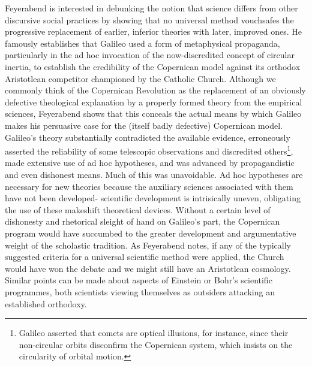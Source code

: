 Feyerabend is interested in debunking the notion that science differs from other discursive social practices by showing that no universal method vouchsafes the progressive replacement of earlier, inferior theories with later, improved ones. He famously establishes that Galileo used a form of metaphysical propaganda, particularly in the ad hoc invocation of the now-discredited concept of circular inertia, to establish the credibility of the Copernican model against its orthodox Aristotlean competitor championed by the Catholic Church. Although we commonly think of the Copernican Revolution as the replacement of an obviously defective theological explanation by a properly formed theory from the empirical sciences, Feyerabend shows that this conceals the actual means by which Galileo makes his persuasive case for the (itself badly defective) Copernican model.  Galileo's theory substantially contradicted the available evidence, erroneously asserted the reliability of some telescopic observations and discredited others\footnote{Galileo asserted that comets are optical illusions, for instance, since their non-circular orbits disconfirm the Copernican system, which insists on the circularity of orbital motion.}, made extensive use of ad hoc hypotheses, and was advanced by propagandistic and even dishonest means. Much of this was unavoidable. Ad hoc hypotheses are necessary for new theories because the auxiliary sciences associated with them have not been developed- scientific development is intrisically uneven, obligating the use of these makeshift theoretical devices. Without a certain level of dishonesty and rhetorical sleight of hand on Galileo's part, the Copernican program would have succumbed to the greater development and argumentative weight of the scholastic tradition. As Feyerabend notes, if any of the typically suggested criteria for a universal scientific method were applied, the Church would have won the debate and we might still have an Aristotlean cosmology. Similar points can be made about aspects of Einstein or Bohr's scientific programmes, both scientists viewing themselves as outsiders attacking an established orthodoxy.

